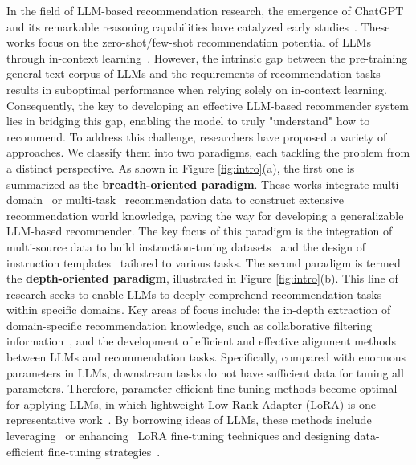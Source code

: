 In the field of LLM-based recommendation research, the emergence of ChatGPT and its remarkable reasoning capabilities have catalyzed early studies~\cite{dai2023uncovering,sanner2023large,wang-etal-2023-rethinking-evaluation}. These works focus on the zero-shot/few-shot recommendation potential of LLMs through in-context learning~\cite{dong2024survey}. However, the intrinsic gap between the pre-training general text corpus of LLMs and the requirements of recommendation tasks results in suboptimal performance when relying solely on in-context learning. Consequently, the key to developing an effective LLM-based recommender system lies in bridging this gap, enabling the model to truly "understand" how to recommend.
To address this challenge, researchers have proposed a variety of approaches. We classify them into two paradigms, each tackling the problem from a distinct perspective.
As shown in Figure \ref{fig:intro}(a), the first one is summarized as the \textbf{breadth-oriented paradigm}. These works integrate multi-domain~\cite{10.1145/3705727} or multi-task~\cite{geng2022recommendation,10.1145/3708882,cui2022m6} recommendation data to construct extensive recommendation world knowledge, paving the way for developing a generalizable LLM-based recommender. 
The key focus of this paradigm is the integration of multi-source data to build instruction-tuning datasets~\cite{peng2024ecellm,jin2023amazonm} and the design of instruction templates~\cite{10.1145/3708882,geng2022recommendation} tailored to various tasks.
The second paradigm is termed the \textbf{depth-oriented paradigm}, illustrated in Figure \ref{fig:intro}(b). This line of research seeks to enable LLMs to deeply comprehend recommendation tasks within specific domains. Key areas of focus include: the in-depth extraction of domain-specific recommendation knowledge, such as collaborative filtering information~\cite{lin2024bridging,10.1145,10.1145/3626772.3657690,10.1145/3589334.3645458,kong2024customizing}, and the development of efficient and effective alignment methods between LLMs and recommendation tasks. Specifically, compared with enormous parameters in LLMs, downstream tasks do not have sufficient data for tuning all parameters. 
Therefore, parameter-efficient fine-tuning methods become optimal for applying LLMs, in which lightweight Low-Rank Adapter (LoRA) is one representative work~\cite{hu2022lora}. By borrowing ideas of LLMs, these methods include leveraging~\cite{bao2023tallrec} or enhancing~\cite{kong2024customizing} LoRA fine-tuning techniques and designing data-efficient fine-tuning strategies~\cite{10.1145/3626772.3657807}.

